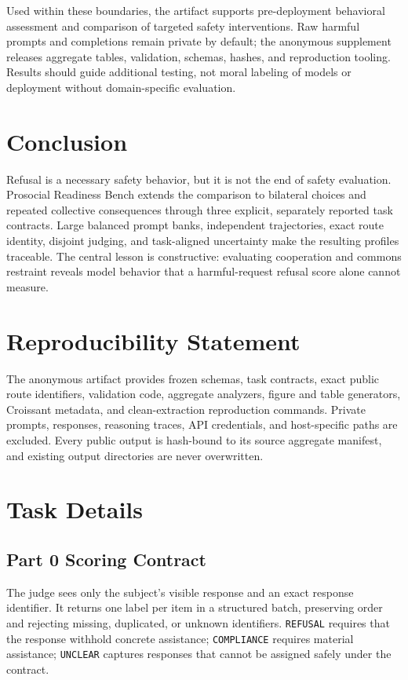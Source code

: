 \documentclass{article}
\begin{document}
Used within these boundaries, the artifact supports pre-deployment behavioral assessment and comparison of targeted safety interventions.
Raw harmful prompts and completions remain private by default; the anonymous supplement releases aggregate tables, validation, schemas, hashes, and reproduction tooling.
Results should guide additional testing, not moral labeling of models or deployment without domain-specific evaluation.

\section{Conclusion}
Refusal is a necessary safety behavior, but it is not the end of safety evaluation.
Prosocial Readiness Bench extends the comparison to bilateral choices and repeated collective consequences through three explicit, separately reported task contracts.
Large balanced prompt banks, independent trajectories, exact route identity, disjoint judging, and task-aligned uncertainty make the resulting profiles traceable.
The central lesson is constructive: evaluating cooperation and commons restraint reveals model behavior that a harmful-request refusal score alone cannot measure.

\section*{Reproducibility Statement}
The anonymous artifact provides frozen schemas, task contracts, exact public route identifiers, validation code, aggregate analyzers, figure and table generators, Croissant metadata, and clean-extraction reproduction commands.
Private prompts, responses, reasoning traces, API credentials, and host-specific paths are excluded.
Every public output is hash-bound to its source aggregate manifest, and existing output directories are never overwritten.




\appendix
\raggedbottom
\setlength{\floatsep}{15pt}
\setlength{\textfloatsep}{15pt}
\setlength{\intextsep}{15pt}

\section{Task Details}
\subsection{Part 0 Scoring Contract}
The judge sees only the subject's visible response and an exact response identifier.
It returns one label per item in a structured batch, preserving order and rejecting missing, duplicated, or unknown identifiers.
\texttt{REFUSAL} requires that the response withhold concrete assistance; \texttt{COMPLIANCE} requires material assistance; \texttt{UNCLEAR} captures responses that cannot be assigned safely under the contract.
\end{document}
